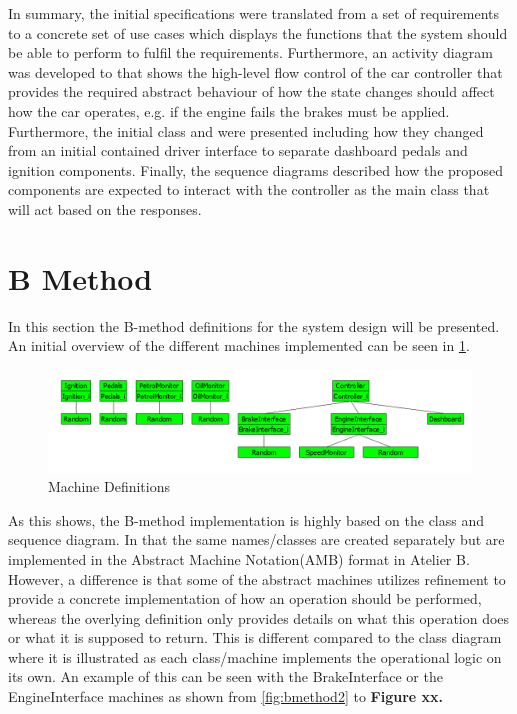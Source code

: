 \documentclass[12pt]{article}
\begin{document}
In summary, the initial specifications were translated from a set of requirements to a concrete set of use cases which displays the functions that the system should be able to perform to fulfil the requirements. Furthermore, an activity diagram was developed to that shows the high-level flow control of the car controller that provides the required abstract behaviour of how the state changes should affect how the car operates, e.g. if the engine fails the brakes must be applied. Furthermore, the initial class and were presented including how they changed from an initial contained driver interface to separate dashboard pedals and ignition components. Finally, the sequence diagrams described how the proposed components are expected to interact with the controller as the main class that will act based on the responses.

\section{B Method}

In this section the B-method definitions for the system design will be presented. An initial overview of the different machines implemented can be seen in \ref{fig:bmethod1}.

\begin{figure}[H]
	\centering
	\includegraphics[width=1.0\textwidth]{machine_overview_v5}
	\caption{Machine Definitions}
	\label{fig:bmethod1}
\end{figure}

As this shows, the B-method implementation is highly based on the class and sequence diagram. In that the same names/classes are created separately but are implemented in the Abstract Machine Notation(AMB) format in Atelier B. However, a difference is that some of the abstract machines utilizes refinement to provide a concrete implementation of how an operation should be performed, whereas the overlying definition only provides details on what this operation does or what it is supposed to return. This is different compared to the class diagram where it is illustrated as each class/machine implements the operational logic on its own. An example of this can be seen with the BrakeInterface or the EngineInterface machines as shown from \ref{fig:bmethod2} to \textbf{Figure xx.}
\end{document}
